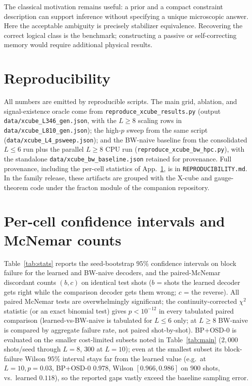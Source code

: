 \documentclass[11pt,a4paper]{article}
\begin{document}
The classical motivation remains useful: a prior and a compact constraint
description can support inference without specifying a unique microscopic
answer. Here the acceptable ambiguity is precisely stabilizer equivalence.
Recovering the correct logical class is the benchmark; constructing a
passive or self-correcting memory would require additional physical results.

\section*{Reproducibility}
{\sloppy
All numbers are emitted by reproducible scripts. The main grid, ablation, and
signal-existence oracle come from \texttt{reproduce\_xcube\_results.py} (output
\texttt{data/xcube\_L346\_gen.json}, with the $L\ge 8$ scaling rows in
\texttt{data/xcube\_L810\_gen.json}); the high-$p$ sweep from the same script
(\texttt{data/xcube\_L4\_psweep.json}); and the BW-naive baseline from the
consolidated $L\le 6$ run plus the parallel $L\ge 8$ CPU run
(\texttt{reproduce\_xcube\_bw\_hpc.py}), with the standalone
\texttt{data/xcube\_bw\_baseline.json} retained for provenance. Full
provenance, including the per-cell statistics of App.~\ref{app:stats}, is in
\texttt{REPRODUCIBILITY.md}. In the family release, these artifacts are grouped
with the X-cube and gauge-theorem code under the fracton module of the companion
repository.\par}

\appendix
\section{Per-cell confidence intervals and McNemar counts}
\label{app:stats}
Table~\ref{tab:stats} reports the seed-bootstrap $95\%$ confidence intervals on
block failure for the learned and BW-naive decoders, and the paired-McNemar
discordant counts $(b,c)$ on identical test shots ($b$ = shots the learned
decoder gets right while the comparison decoder gets them wrong; $c$ = the
reverse). All paired McNemar tests are overwhelmingly significant; the
continuity-corrected $\chi^2$ statistic (or an exact binomial test) gives
$p < 10^{-12}$ in every tabulated paired comparison (learned-vs-BW-naive is
tabulated for $L\le 6$ only; at $L\ge 8$ BW-naive is compared by aggregate
failure rate, not paired shot-by-shot). BP+OSD-0 is evaluated on the smaller
cost-limited subsets noted in Table~\ref{tab:main} ($2{,}000$ shots/seed through
$L=8$, $300$ at $L=10$); even at the smallest subset its block-failure Wilson
$95\%$ interval stays far from the learned value (e.g.\ at $L=10,p=0.03$,
BP+OSD-0 $0.978$, Wilson $[0.966,0.986]$ on $900$ shots, vs.\ learned $0.118$),
so the reported gaps vastly exceed the baseline sampling error.
\end{document}
